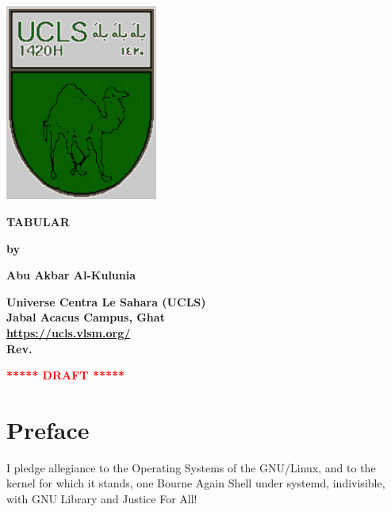 \documentclass[12pt]{article}
\newcommand{\pengarangs}{%
    Abu Akbar Al-Kulunia \\
}
\newcommand{\judul}{%
TABULAR
}
\begin{document}
\begin{titlepage}
    \begin{center}    
        \begin{center}
            \includegraphics[width=50mm]{ucls-coat-grey}
        \end{center}

    \vspace*{15mm}
    \textbf{\Large \judul}

    \vspace*{30mm}       
    \textbf{by}

    \vspace*{15mm}    
    \textbf{\Large \pengarangs}

    \vspace*{4.0cm}
    \textbf{
       Universe Centra Le Sahara (UCLS) \\
       Jabal Acacus Campus, Ghat        \\
       \url{https://ucls.vlsm.org/}     \\
       Rev. \rev%
    }

    \vspace*{5mm}    
    \textbf{\LARGE \textcolor{red}{***** DRAFT *****}}

    \end{center}

\end{titlepage}


\section*{Preface}
I pledge allegiance to the Operating Systems of the GNU/Linux,
and to the kernel for which it stands, one Bourne Again Shell under systemd,
indivisible, with GNU Library and Justice For All!

\vspace*{5mm}
\end{document}
